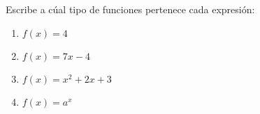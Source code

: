 
\question Escribe a cúal tipo de funciones pertenece cada expresión:

\renewcommand{\labelenumi}{\alph{enumi})} %
\begin{enumerate}
  \item $f(x) = 4$ \fillin[constante]
  \item $f(x) = 7x - 4$ \fillin[lineal]
  \item $f(x) = x^2 + 2x + 3$ \fillin[cuadrática]
  \item $f(x) = a^x$ \fillin[exponencial]
\end{enumerate}
